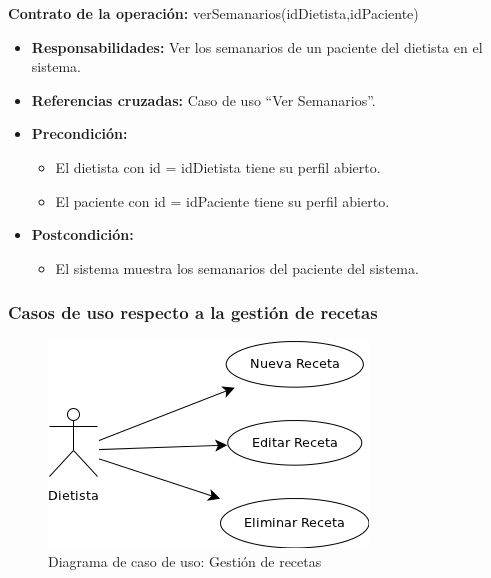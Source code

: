 \textbf{Contrato de la operación:} verSemanarios(idDietista,idPaciente)
\begin{itemize}
\item \textbf{Responsabilidades:} Ver los semanarios de un paciente del dietista en el sistema.
\item \textbf{Referencias cruzadas:} Caso de uso ``Ver Semanarios''.
\item \textbf{Precondición:}
\begin{itemize}
\item El dietista con id = idDietista tiene su perfil abierto.
\item El paciente con id = idPaciente tiene su perfil abierto.
\end{itemize}
\item \textbf{Postcondición:}
\begin{itemize}
\item El sistema muestra los semanarios del paciente del sistema.
\end{itemize}
\end{itemize}

\newpage
\subsubsection{Casos de uso respecto a la gestión de recetas}

\begin{figure}[H]
  \label{cu_receta}
  \begin{center}
    \includegraphics[scale=0.5]{../img/CU_Receta.png}
  \end{center}
  \caption{Diagrama de caso de uso: Gestión de recetas}
\end{figure}

